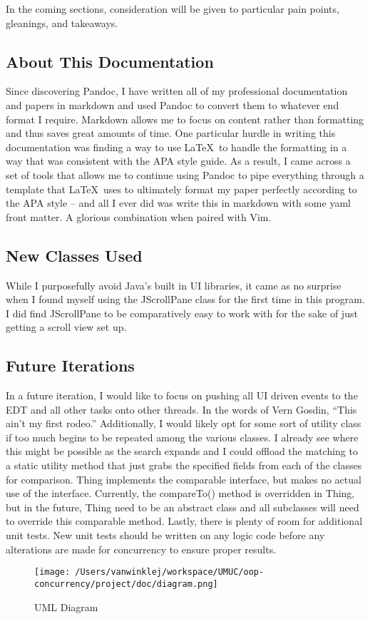 \documentclass[english,floatsintext,man]{apa6}
\begin{document}
In the coming sections, consideration will be given to particular pain
points, gleanings, and takeaways.

\subsection{About This Documentation}\label{about-this-documentation}

Since discovering Pandoc, I have written all of my professional
documentation and papers in markdown and used Pandoc to convert them to
whatever end format I require. Markdown allows me to focus on content
rather than formatting and thus saves great amounts of time. One
particular hurdle in writing this documentation was finding a way to use
\LaTeX~to handle the formatting in a way that was consistent with the
APA style guide. As a result, I came across a set of tools that allows
me to continue using Pandoc to pipe everything through a template that
\LaTeX~uses to ultimately format my paper perfectly according to the APA
style -- and all I ever did was write this in markdown with some yaml
front matter. A glorious combination when paired with Vim.

\subsection{New Classes Used}\label{new-classes-used}

While I purposefully avoid Java's built in UI libraries, it came as no
surprise when I found myself using the JScrollPane class for the first
time in this program. I did find JScrollPane to be comparatively easy to
work with for the sake of just getting a scroll view set up.

\subsection{Future Iterations}\label{future-iterations}

In a future iteration, I would like to focus on pushing all UI driven
events to the EDT and all other tasks onto other threads. In the words
of Vern Gosdin, \enquote{This ain't my first rodeo.} Additionally, I
would likely opt for some sort of utility class if too much begins to be
repeated among the various classes. I already see where this might be
possible as the search expands and I could offload the matching to a
static utility method that just grabs the specified fields from each of
the classes for comparison. Thing implements the comparable interface,
but makes no actual use of the interface. Currently, the compareTo()
method is overridden in Thing, but in the future, Thing need to be an
abstract class and all subclasses will need to override this comparable
method. Lastly, there is plenty of room for additional unit tests. New
unit tests should be written on any logic code before any alterations
are made for concurrency to ensure proper results.

\begin{figure}[htbp]
\centering
\texttt{[image: /Users/vanwinklej/workspace/UMUC/oop-concurrency/project/doc/diagram.png]}
\caption{UML Diagram}
\end{figure}

\setlength{\parindent}{-0.5in} \setlength{\leftskip}{0.5in}
\end{document}

